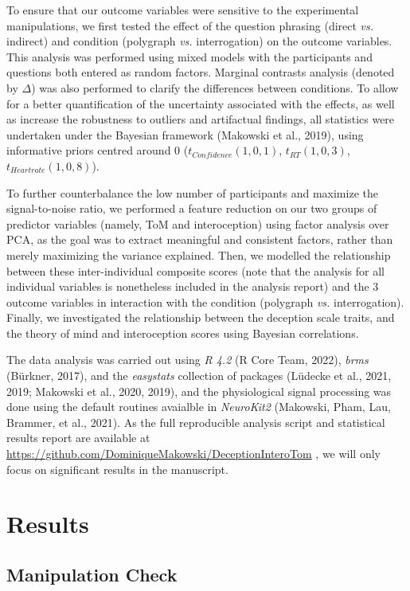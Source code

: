 \documentclass[
  man,floatsintext]{apa6}
\begin{document}
To ensure that our outcome variables were sensitive to the experimental manipulations, we first tested the effect of the question phrasing (direct \emph{vs.} indirect) and condition (polygraph \emph{vs.} interrogation) on the outcome variables. This analysis was performed using mixed models with the participants and questions both entered as random factors. Marginal contrasts analysis (denoted by \(\Delta\)) was also performed to clarify the differences between conditions. To allow for a better quantification of the uncertainty associated with the effects, as well as increase the robustness to outliers and artifactual findings, all statistics were undertaken under the Bayesian framework (Makowski et al., 2019), using informative priors centred around 0 (\(t_{Confidence}(1, 0, 1)\), \(t_{RT}(1, 0, 3)\), \(t_{Heartrate}(1, 0, 8)\)).

To further counterbalance the low number of participants and maximize the signal-to-noise ratio, we performed a feature reduction on our two groups of predictor variables (namely, ToM and interoception) using factor analysis over PCA, as the goal was to extract meaningful and consistent factors, rather than merely maximizing the variance explained. Then, we modelled the relationship between these inter-individual composite scores (note that the analysis for all individual variables is nonetheless included in the analysis report) and the 3 outcome variables in interaction with the condition (polygraph \emph{vs.} interrogation). Finally, we investigated the relationship between the deception scale traits, and the theory of mind and interoception scores using Bayesian correlations.

The data analysis was carried out using \emph{R 4.2} (R Core Team, 2022), \emph{brms} (Bürkner, 2017), and the \emph{easystats} collection of packages (Lüdecke et al., 2021, 2019; Makowski et al., 2020, 2019), and the physiological signal processing was done using the default routines avaialble in \emph{NeuroKit2} (Makowski, Pham, Lau, Brammer, et al., 2021). As the full reproducible analysis script and statistical results report are available at
\url{https://github.com/DominiqueMakowski/DeceptionInteroTom}
, we will only focus on significant results in the manuscript.

\hypertarget{results}{%
\section{Results}\label{results}}

\hypertarget{manipulation-check}{%
\subsection{Manipulation Check}\label{manipulation-check}}
\end{document}
